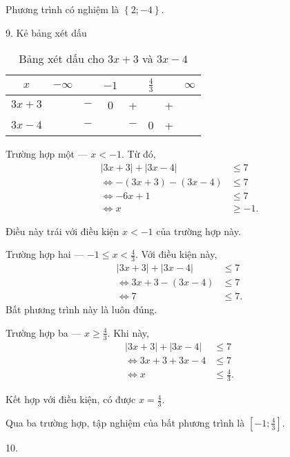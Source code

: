Phương trình có nghiệm là $\left\{2; -4\right\}$.

9. Kẻ bảng xét dấu

\begin{table}[H]
   \centering
   \begin{tabular}{|c|ccccccc|}
   \hline
   $x$          & $-\infty$ &     & $-1$ &     & $\frac{4}{3}$ &   & $\infty$ \\
   \hline
   $3x + 3$        &           & $-$ &  0  &  +  &     & + &           \\
   \hline
   $3x - 4$        &           & $-$ &     & $-$ &  0  & + &           \\
   \hline
   \end{tabular}
   \caption{Bảng xét dấu cho $3x + 3$ và $3x - 4$}
   \label{tab:toan_hoc_nen_tang:ham_so_mot_bien:ham_tung_phan:gpt10}
\end{table}

\textcolor{colorEmphasisCyan}{Trường hợp một --- $x < -1$}. Từ đó,
\begin{align*}
   |3x + 3| + |3x - 4| &\leq 7 \\
   \iff -(3x + 3) - (3x - 4) &\leq 7 \\
   \iff -6x + 1 &\leq 7 \\
   \iff x &\geq -1.
\end{align*}

Điều này trái với điều kiện $x < -1$ của trường hợp này.

\textcolor{colorEmphasis}{Trường hợp hai --- $-1 \leq x < \frac{4}{3}$}. Với điều kiện này,
\begin{align*}
   |3x + 3| + |3x - 4| &\leq 7 \\
   \iff 3x + 3 - (3x - 4) &\leq 7 \\
   \iff 7 &\leq 7.
\end{align*}
Bất phương trình này là luôn đúng.

\textcolor{colorEmphasisGreen}{Trường hợp ba --- $x \geq \frac{4}{3}$}. Khi này,
\begin{align*}
   |3x + 3| + |3x - 4| &\leq 7 \\
   \iff 3x + 3 + 3x - 4 &\leq 7 \\
   \iff x &\leq \frac{4}{3}.
\end{align*}

Kết hợp với điều kiện, có được $x = \frac{4}{3}$.

Qua ba trường hợp, tập nghiệm của bất phương trình là $\left[-1; \frac{4}{3}\right]$.

10.

